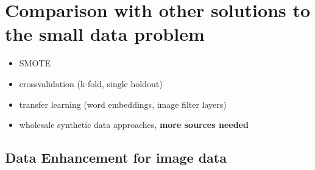 \chapter{Comparison with other solutions to the small data problem}


\begin{itemize}
	\item \ac{SMOTE}
	\item crossvalidation (k-fold, single holdout)
	\item transfer learning (word embeddings, image filter layers)
	\item wholesale synthetic data approaches, \cite{10.1145/3339252.3339281}  \textbf{more sources needed}
\end{itemize}


\section{Data Enhancement for image data} \label{enhace_imagedata}